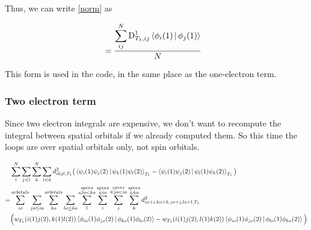 \documentclass[a4paper]{article}
\begin{document}
Thus, we can write \ref{norm} as

\begin{equation}
 \begin{aligned}
  &=  \frac{\displaystyle \sum_{ij}^{N}  \text{D}_{T_1, ij}^1 \Braket{\phi_i(1) | \phi_j(1)}}{N}
    \label{final_norm}
     \end{aligned}
     \end{equation}
     

This form is used in the code, in the same place as the one-electron term.
 
\subsubsection{Two electron term}

Since two electron integrals are expensive, we don't want to recompute the integral between spatial orbitals if we already computed them. 
So this time the loops are over spatial orbitals only, not spin orbitals. 

\begin{equation}
 \begin{aligned}
  &  \displaystyle \sum_i^{N}  \sum_{j<i}\sum_k^{N}\sum_{l<k}                                                                                                                                                     
          d^2_{ikjl, T_1} \big(\Braket{  \psi_i(1) \psi_j(2) | \psi_k(1) \psi_l(2) }_{T_1}-\Braket{  \psi_i(1) \psi_j(2) | \psi_l(1) \psi_k(2) }_{T_1} \big) \\
          =& \sum_{io}^{orbitals}\sum_{jo\leq io}\sum_{ko}^{orbitals}\sum_{lo\leq ko}        
          \sum_l^{\substack{spins \\ \in lo<ko}}                                                                                                                                  
 \sum_i^{\substack{spins \\ \in io}}\sum_j^{\substack{spins \\ \in jo<io}}\sum_k^{\substack{spins \\ \in ko}} 
  d^2_{io+i,ko+k,jo+j,lo+l,T_1}      \\                                                                                                                                                  
    & \Big(  w_{T_1}( i(1) j(2), k(1) l(2) ) \Braket{ \phi_{io}(1) \phi_{jo}(2) | \phi_{ko}(1) \phi_{lo}(2) }                                                                                                                                              
    - w_{T_1}( i(1) j(2), l(1) k(2) ) \Braket{ \phi_{io}(1) \phi_{jo}(2) | \phi_{lo}(1) \phi_{ko}(2) } \Big) 
    \label{spat}
     \end{aligned}
     \end{equation}
\end{document}
